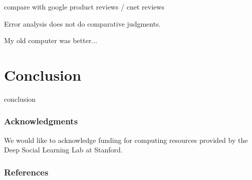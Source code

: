 \documentclass{article} %
\begin{document}
compare with google product reviews / cnet reviews

Error analysis
does not do comparative judgments.

My old computer was better...




\section{Conclusion}

conclusion







\subsubsection*{Acknowledgments}

We would like to acknowledge funding for computing resources provided by the Deep Social Learning Lab at Stanford.

\subsubsection*{References} %
\end{document}
